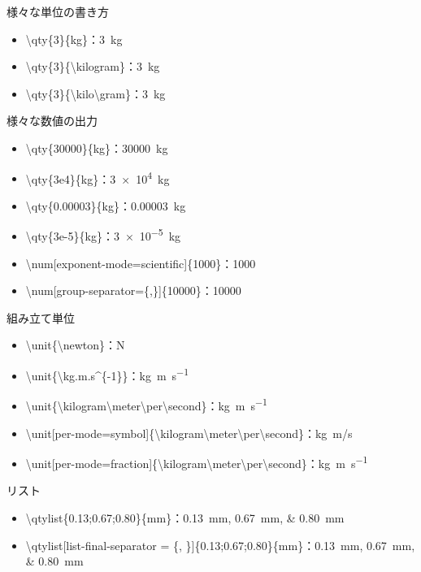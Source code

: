 \documentclass[11pt]{jsarticle}
\begin{document}
様々な単位の書き方

\begin{itemize}
  \item \textbackslash qty\{3\}\{kg\}：\qty{3}{kg}
  \item \textbackslash qty\{3\}\{\textbackslash kilogram\}：\qty{3}{\kilogram}
  \item \textbackslash qty\{3\}\{\textbackslash kilo\textbackslash gram\}：\qty{3}{\kilo\gram}
\end{itemize}

様々な数値の出力

\begin{itemize}
  \item \textbackslash qty\{30000\}\{kg\}：\qty{30000}{kg}
  \item \textbackslash qty\{3e4\}\{kg\}：\qty{3e4}{kg}
  \item \textbackslash qty\{0.00003\}\{kg\}：\qty{0.00003}{kg}
  \item \textbackslash qty\{3e-5\}\{kg\}：\qty{3e-5}{kg}
  \item \textbackslash num[exponent-mode=scientific]\{1000\}：\num[exponent-mode=scientific]{1000}
  \item \textbackslash num[group-separator=\{,\}]\{10000\}：\num[group-separator={,}]{10000}
\end{itemize}

組み立て単位

\begin{itemize}
  \item \textbackslash unit\{\textbackslash newton\}：\unit{\newton}
  \item \textbackslash unit\{\textbackslash kg.m.s\textasciicircum\{-1\}\}：\unit{kg.m.s^{-1}}
  \item \textbackslash unit\{\textbackslash kilogram\textbackslash meter\textbackslash per\textbackslash second\}：\unit{\kilogram\meter\per\second}
  \item \textbackslash unit[per-mode=symbol]\{\textbackslash kilogram\textbackslash meter\textbackslash per\textbackslash second\}：\unit[per-mode=symbol]{\kilogram\meter\per\second}
  \item \textbackslash unit[per-mode=fraction]\{\textbackslash kilogram\textbackslash meter\textbackslash per\textbackslash second\}：\unit[per-mode=fraction]{\kilogram\meter\per\second}
\end{itemize}

リスト

\begin{itemize}
  \item \textbackslash qtylist\{0.13;0.67;0.80\}\{mm\}：\qtylist{0.13;0.67;0.80}{mm}
  \item \textbackslash qtylist[list-final-separator = \{, \}]\{0.13;0.67;0.80\}\{mm\}：\qtylist[list-final-separator = {, }]{0.13;0.67;0.80}{mm}
\end{itemize}
\end{document}
